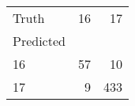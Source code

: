 \begin{tabular}{lrr}
\toprule
Truth & 16 & 17 \\
Predicted &  &  \\
\midrule
16 & 57 & 10 \\
17 & 9 & 433 \\
\bottomrule
\end{tabular}
